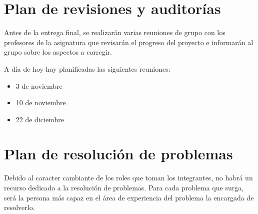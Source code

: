 \section{Plan de revisiones y auditorías}

Antes de la entrega final, se realizarán varias reuniones de grupo con los
profesores de la asignatura que revisarán el progreso del proyecto e informarán
al grupo sobre los aspectos a corregir.

A día de hoy hay planificadas las siguientes reuniones:

\begin{itemize}
\item 3 de noviembre
\item 10 de noviembre
\item 22 de diciembre
\end{itemize}

\section{Plan de resolución de problemas}

Debido al caracter cambiante de los roles que toman los integrantes, no habrá
un recurso dedicado a la resolución de problemas. Para cada problema que surga,
será la persona más capaz en el área de experiencia del problema la encargada
de resolverlo.
